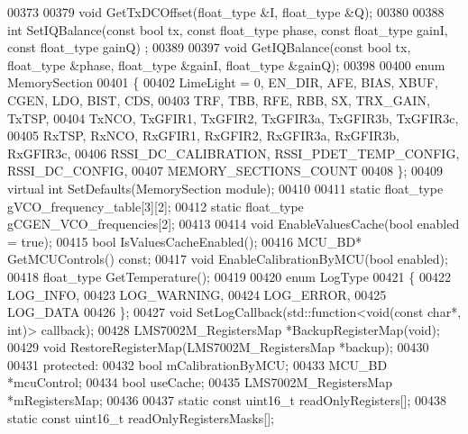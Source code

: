 \begin{DoxyCode}
00373 
00379     \textcolor{keywordtype}{void} GetTxDCOffset(float\_type &I, float\_type &Q);
00380 
00388     \textcolor{keywordtype}{int} SetIQBalance(\textcolor{keyword}{const} \textcolor{keywordtype}{bool} tx, \textcolor{keyword}{const} float\_type phase, \textcolor{keyword}{const} float\_type gainI, \textcolor{keyword}{const} float\_type gainQ)
      ;
00389 
00397     \textcolor{keywordtype}{void} GetIQBalance(\textcolor{keyword}{const} \textcolor{keywordtype}{bool} tx, float\_type &phase, float\_type &gainI, float\_type &gainQ);
00398 
00400     \textcolor{keyword}{enum} MemorySection
00401     \{
00402         LimeLight = 0, EN\_DIR, AFE, BIAS, XBUF, CGEN, LDO, BIST, CDS,
00403         TRF, TBB, RFE, RBB, SX, TRX\_GAIN, TxTSP,
00404         TxNCO, TxGFIR1, TxGFIR2, TxGFIR3a, TxGFIR3b, TxGFIR3c,
00405         RxTSP, RxNCO, RxGFIR1, RxGFIR2, RxGFIR3a, RxGFIR3b, RxGFIR3c,
00406         RSSI\_DC\_CALIBRATION, RSSI_PDET_TEMP_CONFIG, RSSI\_DC\_CONFIG,
00407         MEMORY\_SECTIONS\_COUNT
00408     \};
00409     \textcolor{keyword}{virtual} \textcolor{keywordtype}{int} SetDefaults(MemorySection module);
00410 
00411     \textcolor{keyword}{static} float\_type gVCO\_frequency\_table[3][2];
00412     \textcolor{keyword}{static} float\_type gCGEN\_VCO\_frequencies[2];
00413 
00414     \textcolor{keywordtype}{void} EnableValuesCache(\textcolor{keywordtype}{bool} enabled = \textcolor{keyword}{true});
00415     \textcolor{keywordtype}{bool} IsValuesCacheEnabled();
00416     MCU_BD* GetMCUControls() \textcolor{keyword}{const};
00417     \textcolor{keywordtype}{void} EnableCalibrationByMCU(\textcolor{keywordtype}{bool} enabled);
00418     float\_type GetTemperature();
00419 
00420     \textcolor{keyword}{enum} LogType
00421     \{
00422         LOG_INFO,
00423         LOG_WARNING,
00424         LOG_ERROR,
00425         LOG\_DATA
00426     \};
00427     \textcolor{keywordtype}{void} SetLogCallback(std::function<\textcolor{keywordtype}{void}(\textcolor{keyword}{const} \textcolor{keywordtype}{char}*, \textcolor{keywordtype}{int})> callback);
00428     LMS7002M_RegistersMap *BackupRegisterMap(\textcolor{keywordtype}{void});
00429     \textcolor{keywordtype}{void} RestoreRegisterMap(LMS7002M_RegistersMap *backup);
00430 
00431 \textcolor{keyword}{protected}:
00432     \textcolor{keywordtype}{bool} mCalibrationByMCU;
00433     MCU_BD *mcuControl;
00434     \textcolor{keywordtype}{bool} useCache;
00435     LMS7002M_RegistersMap *mRegistersMap;
00436 
00437     \textcolor{keyword}{static} \textcolor{keyword}{const} uint16\_t readOnlyRegisters[];
00438     \textcolor{keyword}{static} \textcolor{keyword}{const} uint16\_t readOnlyRegistersMasks[];

\end{DoxyCode}
